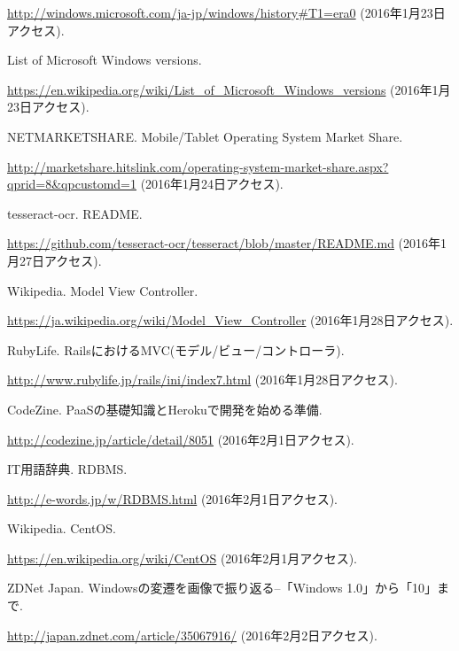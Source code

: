 \begin{thebibliography}{99}
\url{http://windows.microsoft.com/ja-jp/windows/history#T1=era0}
(2016年1月23日アクセス).

List of Microsoft Windows versions.

\url{https://en.wikipedia.org/wiki/List_of_Microsoft_Windows_versions}
(2016年1月23日アクセス).

NETMARKETSHARE. Mobile/Tablet Operating System Market Share.

\url{http://marketshare.hitslink.com/operating-system-market-share.aspx?qprid=8&qpcustomd=1}
(2016年1月24日アクセス).

tesseract-ocr. README.

\url{https://github.com/tesseract-ocr/tesseract/blob/master/README.md}
(2016年1月27日アクセス).

Wikipedia. Model View Controller.

\url{https://ja.wikipedia.org/wiki/Model_View_Controller}
(2016年1月28日アクセス).

RubyLife. RailsにおけるMVC(モデル/ビュー/コントローラ).

\url{http://www.rubylife.jp/rails/ini/index7.html}
(2016年1月28日アクセス).

CodeZine. PaaSの基礎知識とHerokuで開発を始める準備.

\url{http://codezine.jp/article/detail/8051}
(2016年2月1日アクセス).

IT用語辞典. RDBMS.

\url{http://e-words.jp/w/RDBMS.html}
(2016年2月1日アクセス).

Wikipedia. CentOS.

\url{https://en.wikipedia.org/wiki/CentOS}
(2016年2月1月アクセス).

ZDNet Japan. Windowsの変遷を画像で振り返る--「Windows 1.0」から「10」まで.

\url{http://japan.zdnet.com/article/35067916/}
(2016年2月2日アクセス).

\end{thebibliography}
